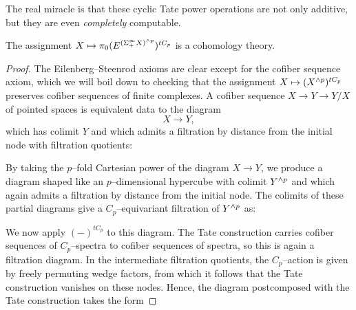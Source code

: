 The real miracle is that these cyclic Tate power operations are not only additive, but they are even \emph{completely} computable.

\begin{lemma}\label{TateConstructionIsACohomThy}
The assignment \(X \mapsto \pi_0 (E^{(\Sigma^\infty_+ X)^{\wedge p}})^{tC_p}\) is a cohomology theory.
\end{lemma}
\begin{proof}
The Eilenberg--Steenrod axioms are clear except for the cofiber sequence axiom, which we will boil down to checking that the assignment \(X \mapsto (X^{\wedge p})^{tC_p}\) preserves cofiber sequences of finite complexes.  A cofiber sequence \(X \to Y \to Y/X\) of pointed spaces is equivalent data to the diagram \[X \to Y,\] which has colimit \(Y\) and which admits a filtration by distance from the initial node with filtration quotients:
\begin{center}
\end{center}
By taking the \(p\)--fold Cartesian power of the diagram \(X \to Y\), we produce a diagram shaped like an \(p\)--dimensional hypercube with colimit \(Y^{\wedge p}\) and which again admits a filtration by distance from the initial node.  The colimits of these partial diagrams give a \(C_p\)--equivariant filtration of \(Y^{\wedge p}\) as:
\begin{center}
\end{center}
We now apply \((-)^{tC_p}\) to this diagram.  The Tate construction carries cofiber sequences of \(C_p\)--spectra to cofiber sequences of spectra, so this is again a filtration diagram.  In the intermediate filtration quotients, the \(C_p\)--action is given by freely permuting wedge factors, from which it follows that the Tate construction vanishes on these nodes.  Hence, the diagram postcomposed with the Tate construction takes the form

\end{proof}
